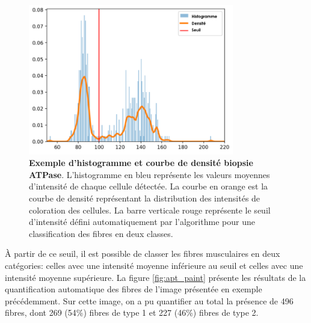 \begin{figure}[htbp]
 \centering
 \includegraphics[width=0.8\textwidth]{figures/density_plot.png}
 \caption[Exemple d'histogramme et courbe de densité biopsie ATPase]{\textbf{Exemple d'histogramme et courbe de densité biopsie ATPase}. L'histogramme en bleu représente les valeurs moyennes d'intensité de chaque cellule détectée. La courbe en orange est la courbe de densité représentant la distribution des intensités de coloration des cellules. La barre verticale rouge représente le seuil d'intensité défini automatiquement par l'algorithme pour une classification des fibres en deux classes.}
 \label{fig:atp_density}
\end{figure}

À partir de ce seuil, il est possible de classer les fibres musculaires en deux catégories: celles avec une intensité moyenne inférieure au seuil et celles avec une intensité moyenne supérieure. La figure \ref{fig:apt_paint} présente les résultats de la quantification automatique des fibres de l'image présentée en exemple précédemment. Sur cette image, on a pu quantifier au total la présence de 496 fibres, dont 269 (54\%) fibres de type 1 et 227 (46\%) fibres de type 2. 

